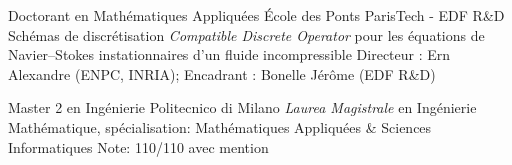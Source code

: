 \documentclass[french]{RMcv}
\begin{document}






%
%


%
        {Doctorant en Math\'ematiques Appliqu\'ees}%
        {\'Ecole des Ponts ParisTech - EDF R\&D}%
        {Sch\'emas de discr\'etisation \emph{Compatible Discrete Operator} pour les \'equations de Navier--Stokes instationnaires d'un fluide incompressible}%
        {Directeur : Ern Alexandre (ENPC, INRIA); Encadrant : Bonelle J\'er\^ome (EDF R\&D)}

%
        {Master 2 en Ing\'enierie}%
        {Politecnico di Milano}%
        {\emph{Laurea Magistrale} en Ing\'enierie Math\'ematique, sp\'ecialisation: Math\'ematiques Appliqu\'ees \& Sciences Informatiques}%
        {Note: 110/110 avec mention}
\end{document}
